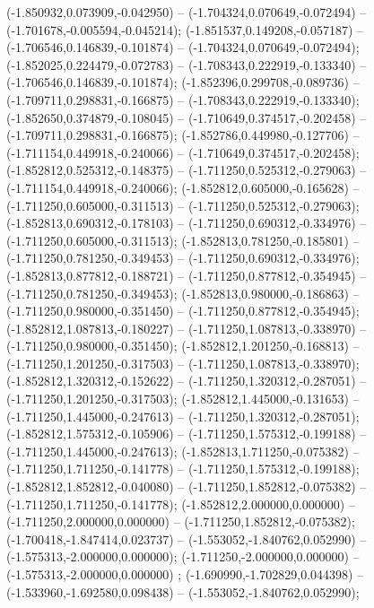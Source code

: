  (-1.850932,0.073909,-0.042950) -- (-1.704324,0.070649,-0.072494) -- (-1.701678,-0.005594,-0.045214);
 (-1.851537,0.149208,-0.057187) -- (-1.706546,0.146839,-0.101874) -- (-1.704324,0.070649,-0.072494);
 (-1.852025,0.224479,-0.072783) -- (-1.708343,0.222919,-0.133340) -- (-1.706546,0.146839,-0.101874);
 (-1.852396,0.299708,-0.089736) -- (-1.709711,0.298831,-0.166875) -- (-1.708343,0.222919,-0.133340);
 (-1.852650,0.374879,-0.108045) -- (-1.710649,0.374517,-0.202458) -- (-1.709711,0.298831,-0.166875);
 (-1.852786,0.449980,-0.127706) -- (-1.711154,0.449918,-0.240066) -- (-1.710649,0.374517,-0.202458);
 (-1.852812,0.525312,-0.148375) -- (-1.711250,0.525312,-0.279063) -- (-1.711154,0.449918,-0.240066);
 (-1.852812,0.605000,-0.165628) -- (-1.711250,0.605000,-0.311513) -- (-1.711250,0.525312,-0.279063);
 (-1.852813,0.690312,-0.178103) -- (-1.711250,0.690312,-0.334976) -- (-1.711250,0.605000,-0.311513);
 (-1.852813,0.781250,-0.185801) -- (-1.711250,0.781250,-0.349453) -- (-1.711250,0.690312,-0.334976);
 (-1.852813,0.877812,-0.188721) -- (-1.711250,0.877812,-0.354945) -- (-1.711250,0.781250,-0.349453);
 (-1.852813,0.980000,-0.186863) -- (-1.711250,0.980000,-0.351450) -- (-1.711250,0.877812,-0.354945);
 (-1.852812,1.087813,-0.180227) -- (-1.711250,1.087813,-0.338970) -- (-1.711250,0.980000,-0.351450);
 (-1.852812,1.201250,-0.168813) -- (-1.711250,1.201250,-0.317503) -- (-1.711250,1.087813,-0.338970);
 (-1.852812,1.320312,-0.152622) -- (-1.711250,1.320312,-0.287051) -- (-1.711250,1.201250,-0.317503);
 (-1.852812,1.445000,-0.131653) -- (-1.711250,1.445000,-0.247613) -- (-1.711250,1.320312,-0.287051);
 (-1.852812,1.575312,-0.105906) -- (-1.711250,1.575312,-0.199188) -- (-1.711250,1.445000,-0.247613);
 (-1.852813,1.711250,-0.075382) -- (-1.711250,1.711250,-0.141778) -- (-1.711250,1.575312,-0.199188);
 (-1.852812,1.852812,-0.040080) -- (-1.711250,1.852812,-0.075382) -- (-1.711250,1.711250,-0.141778);
 (-1.852812,2.000000,0.000000) -- (-1.711250,2.000000,0.000000) -- (-1.711250,1.852812,-0.075382);
 (-1.700418,-1.847414,0.023737) -- (-1.553052,-1.840762,0.052990) -- (-1.575313,-2.000000,0.000000);
 (-1.711250,-2.000000,0.000000) -- (-1.575313,-2.000000,0.000000) ;
 (-1.690990,-1.702829,0.044398) -- (-1.533960,-1.692580,0.098438) -- (-1.553052,-1.840762,0.052990);
